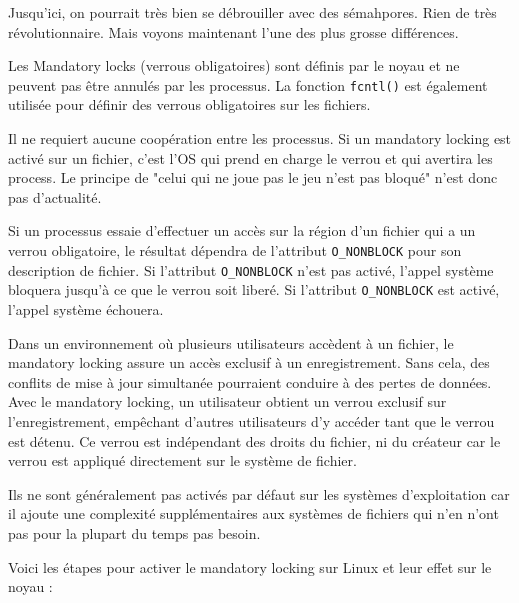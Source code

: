 Jusqu'ici, on pourrait très bien se débrouiller avec des sémahpores. Rien de très révolutionnaire. Mais voyons maintenant l'une des plus grosse différences.
\newline

Les Mandatory locks (verrous obligatoires) sont définis par le noyau et ne peuvent pas être annulés par les processus. La fonction \texttt{fcntl()} est également utilisée pour définir des verrous obligatoires sur les fichiers.

Il ne requiert aucune coopération entre les processus. Si un mandatory locking est activé sur un fichier, c’est l’OS qui prend en charge le verrou et qui avertira les process. Le principe de "celui qui ne joue pas le jeu n'est pas bloqué" n'est donc pas d'actualité.
\newline

Si un processus essaie d'effectuer un accès sur la région d'un fichier qui a un verrou obligatoire, le résultat dépendra de l'attribut \texttt{O\_NONBLOCK} pour son description de fichier. Si l'attribut \texttt{O\_NONBLOCK} n'est pas activé, l'appel système bloquera jusqu'à ce que le verrou soit liberé. Si l'attribut \texttt{O\_NONBLOCK} est activé, l'appel système échouera.
\newline

Dans un environnement où plusieurs utilisateurs accèdent à un fichier, le mandatory locking assure un accès exclusif à un enregistrement. Sans cela, des conflits de mise à jour simultanée pourraient conduire à des pertes de données. Avec le mandatory locking, un utilisateur obtient un verrou exclusif sur l'enregistrement, empêchant d'autres utilisateurs d'y accéder tant que le verrou est détenu. Ce verrou est indépendant des droits du fichier, ni du créateur car le verrou est appliqué directement sur le système de fichier.
\newline

Ils ne sont généralement pas activés par défaut sur les systèmes d'exploitation car il ajoute une complexité supplémentaires aux systèmes de fichiers qui n'en n'ont pas pour la plupart du temps pas besoin.
\newline

Voici les étapes pour activer le mandatory locking sur Linux et leur effet sur le noyau :

